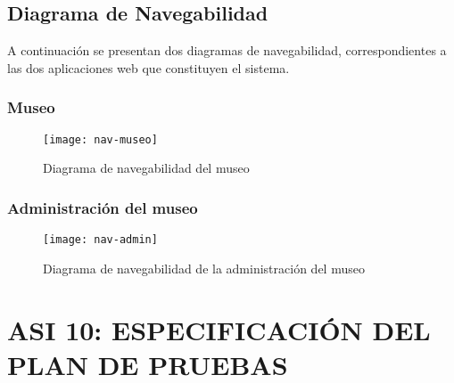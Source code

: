 \subsection{Diagrama de Navegabilidad}
A continuación se presentan dos diagramas de navegabilidad, correspondientes a las dos aplicaciones web que constituyen el sistema.
\subsubsection{Museo}
\begin{figure}[H]
\centering
\texttt{[image: nav-museo]}
\caption{Diagrama de navegabilidad del museo}
\end{figure}

\subsubsection{Administración del museo}
\begin{figure}[H]
\centering
\texttt{[image: nav-admin]}
\caption{Diagrama de navegabilidad de la administración del museo}
\end{figure}

\newpage
\section{ASI 10: ESPECIFICACIÓN DEL PLAN DE PRUEBAS}
